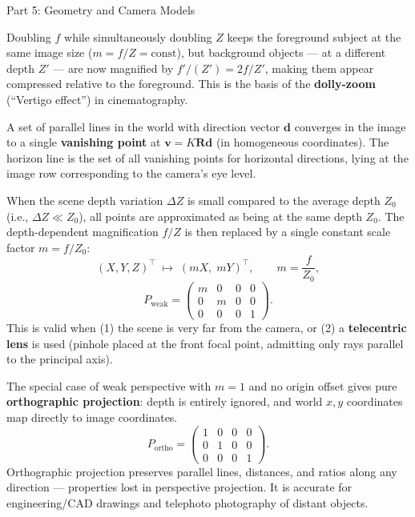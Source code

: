 \documentclass[letterpaper]{article}
\begin{document}
\begin{notes}{Part 5: Geometry and Camera Models}

Doubling $f$ while simultaneously doubling $Z$ keeps the foreground
subject at the same image size ($m = f/Z = \text{const}$), but
background objects --- at a different depth $Z'$ --- are now magnified by
$f'/(Z') = 2f/Z'$, making them appear compressed relative to the
foreground.  This is the basis of the \textbf{dolly-zoom} (``Vertigo
effect'') in cinematography.


A set of parallel lines in the world with direction vector $\mathbf{d}$
converges in the image to a single \textbf{vanishing point} at
$\mathbf{v} = K\mathbf{R}\mathbf{d}$ (in homogeneous coordinates).
The horizon line is the set of all vanishing points for horizontal
directions, lying at the image row corresponding to the camera's eye level.



When the scene depth variation $\Delta Z$ is small compared to the
average depth $Z_0$ (i.e., $\Delta Z \ll Z_0$), all points are
approximated as being at the same depth $Z_0$.  The depth-dependent
magnification $f/Z$ is then replaced by a single constant scale factor
$m = f/Z_0$:
\begin{equation}
  (X, Y, Z)^\top \;\longmapsto\; (mX,\; mY)^\top,
  \qquad m = \frac{f}{Z_0},
\end{equation}
\begin{equation}
  P_{\text{weak}} =
  \begin{pmatrix}
    m & 0 & 0 & 0 \\
    0 & m & 0 & 0 \\
    0 & 0 & 0 & 1
  \end{pmatrix}.
\end{equation}
This is valid when (1) the scene is very far from the camera, or (2) a
\textbf{telecentric lens} is used (pinhole placed at the front focal
point, admitting only rays parallel to the principal axis).


The special case of weak perspective with $m = 1$ and no origin offset
gives pure \textbf{orthographic projection}: depth is entirely ignored,
and world $x, y$ coordinates map directly to image coordinates.
\begin{equation}
  P_{\text{ortho}} =
  \begin{pmatrix}
    1 & 0 & 0 & 0 \\
    0 & 1 & 0 & 0 \\
    0 & 0 & 0 & 1
  \end{pmatrix}.
\end{equation}
Orthographic projection preserves parallel lines, distances, and ratios
along any direction --- properties lost in perspective projection.
It is accurate for engineering/CAD drawings and telephoto photography of
distant objects.


\end{notes}
\end{document}
